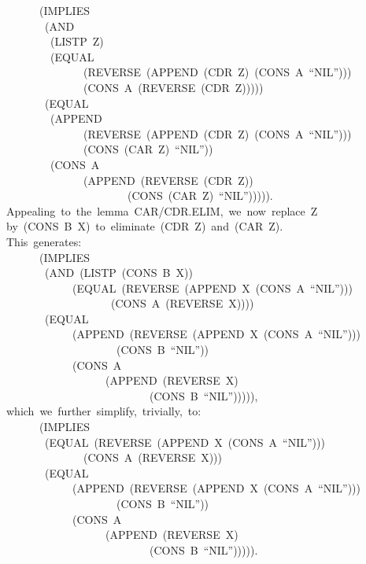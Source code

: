 \documentclass[11pt]{book}
\newenvironment{pubasis}{\begin{flushleft}\ttfamily\small}{\normalsize\rmfamily\end{flushleft}}
\begin{document}
\begin{pubasis}
~~~~~~~~~~(IMPLIES\\
~~~~~~~~~~~(AND\\
~~~~~~~~~~~~(LISTP~Z)\\
~~~~~~~~~~~~(EQUAL\\
~~~~~~~~~~~~~~~~~~(REVERSE~(APPEND~(CDR~Z)~(CONS~A~``NIL'')))\\
~~~~~~~~~~~~~~~~~~(CONS~A~(REVERSE~(CDR~Z)))))\\
~~~~~~~~~~~(EQUAL\\
~~~~~~~~~~~~(APPEND\\
~~~~~~~~~~~~~~~~~~(REVERSE~(APPEND~(CDR~Z)~(CONS~A~``NIL'')))\\
~~~~~~~~~~~~~~~~~~(CONS~(CAR~Z)~``NIL''))\\
~~~~~~~~~~~~(CONS~A\\
~~~~~~~~~~~~~~~~~~(APPEND~(REVERSE~(CDR~Z))\\
~~~~~~~~~~~~~~~~~~~~~~~~~~(CONS~(CAR~Z)~``NIL''))))).\\

~~~~Appealing~to~the~lemma~CAR/CDR.ELIM,~we~now~replace~Z\\
~~~~by~(CONS~B~X)~to~eliminate~(CDR~Z)~and~(CAR~Z).\\
~~~~This~generates:\\

~~~~~~~~~~(IMPLIES\\
~~~~~~~~~~~(AND~(LISTP~(CONS~B~X))\\
~~~~~~~~~~~~~~~~(EQUAL~(REVERSE~(APPEND~X~(CONS~A~``NIL'')))\\
~~~~~~~~~~~~~~~~~~~~~~~(CONS~A~(REVERSE~X))))\\
~~~~~~~~~~~(EQUAL\\
~~~~~~~~~~~~~~~~(APPEND~(REVERSE~(APPEND~X~(CONS~A~``NIL'')))\\
~~~~~~~~~~~~~~~~~~~~~~~~(CONS~B~``NIL''))\\
~~~~~~~~~~~~~~~~(CONS~A\\
~~~~~~~~~~~~~~~~~~~~~~(APPEND~(REVERSE~X)\\
~~~~~~~~~~~~~~~~~~~~~~~~~~~~~~(CONS~B~``NIL''))))),\\

~~~~which~we~further~simplify,~trivially,~to:\\

~~~~~~~~~~(IMPLIES\\
~~~~~~~~~~~(EQUAL~(REVERSE~(APPEND~X~(CONS~A~``NIL'')))\\
~~~~~~~~~~~~~~~~~~(CONS~A~(REVERSE~X)))\\
~~~~~~~~~~~(EQUAL\\
~~~~~~~~~~~~~~~~(APPEND~(REVERSE~(APPEND~X~(CONS~A~``NIL'')))\\
~~~~~~~~~~~~~~~~~~~~~~~~(CONS~B~``NIL''))\\
~~~~~~~~~~~~~~~~(CONS~A\\
~~~~~~~~~~~~~~~~~~~~~~(APPEND~(REVERSE~X)\\
~~~~~~~~~~~~~~~~~~~~~~~~~~~~~~(CONS~B~``NIL''))))).\\


\end{pubasis}
\end{document}

